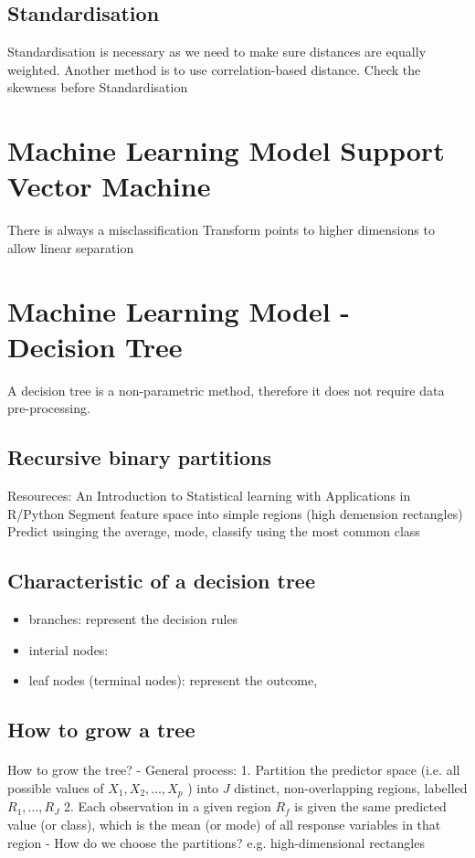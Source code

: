 \documentclass[12pt,a4paper]{article}
\begin{document}
\subsection{Standardisation}
    Standardisation is necessary as we need to make sure distances are equally weighted. Another method is to use correlation-based distance.
    Check the skewness before Standardisation

\section{Machine Learning Model Support Vector Machine}
    There is always a misclassification
    Transform points to higher dimensions to allow linear separation

\section{Machine Learning Model - Decision Tree}
    A decision tree is a non-parametric method, therefore it does not require data pre-processing.
    \subsection{Recursive binary partitions}
        Resoureces: An Introduction to Statistical learning with Applications in R/Python
        Segment feature space into simple regions (high demension rectangles)
        Predict usinging the average, mode, classify using the most common class
    \subsection{Characteristic of a decision tree}
        \begin{itemize}
            \item branches: represent the decision rules
            \item interial nodes:
            \item leaf nodes (terminal nodes): represent the outcome, 
        \end{itemize}

    \subsection{How to grow a tree}
    \paragraph{}
    How to grow the tree?
    - General process:
    1. Partition the predictor space (i.e. all possible values of $X_1, X_2, \ldots, X_p$ ) into $J$ distinct, non-overlapping regions, labelled $R_1, \ldots, R_J$
    2. Each observation in a given region $R_f$ is given the same predicted value (or class), which is the mean (or mode) of all response variables in that region
    - How do we choose the partitions? e.g. high-dimensional rectangles
\end{document}
